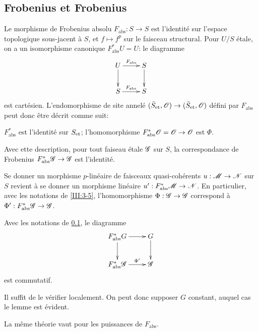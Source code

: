 \subsection{Frobenius et Frobenius}\label{III:3-4}

Le morphisme de Frobenius absolu $F_\text{abs}:S\to S$ est l'identité sur 
l'espace topologique sous-jacent à $S$, et $f\mapsto f^p$ sur le faisceau 
structural. Pour $U/S$ étale, on a un isomorphisme canonique 
$F_\text{abs}^* U=U$: le diagramme 
\[\xymatrix{
  U \ar[r]^-{F_\text{abs}} \ar[d] 
    & S \ar[d] \\
  S \ar[r]^-{F_\text{abs}} 
    & S
}\]
est cartésien. L'endomorphisme de site annelé 
$({\bar S}_{\textnormal{et}},\mathscr{O})\to({\bar S}_{\textnormal{et}},\mathscr{O})$ défini par $F_\text{abs}$ peut donc 
être décrit comme suit:
\begin{center}
  $F_\text{abs}^*$ est l'identité sur ${S}_{\textnormal{et}}$; l'homomorphisme 
  $F_\text{abs}^*\mathscr{O}=\mathscr{O}\to\mathscr{O}$ est $\Phi$.
\end{center}
Avec ette description, pour tout faiseau étale $\mathscr{G}$ sur $S$, la 
correspondance de Frobenius $F_\text{abs}^*\mathscr{G}\to\mathscr{G}$ est l'identité. 

Se donner un morphisme $p$-linéaire de faisceaux quasi-cohérents 
$u:\mathscr{M}\to\mathscr{N}$ sur $S$ revient à se donner un morphisme linéaire 
$u':F_\text{abs}^*\mathscr{M}\to\mathscr{N}$. En particulier, avec les notations de 
\ref{III:3-5}, l'homomorphisme $\Phi:\mathscr{G}\to\mathscr{G}$ correspond à 
$\Phi':F_\text{abs}^*\mathscr{G}\to\mathscr{G}$. 





\begin{lemma_}\label{III:3-5}
Avec les notations de \ref{III:3-4}, le diagramme 
\[\xymatrix{
  F_\textnormal{abs}^* G \ar[r] \ar[d] 
    & G \ar[d] \\
  F_\textnormal{abs}^*\cG \ar[r]^-{\Phi'} 
    & \cG 
}\]
est commutatif.
\end{lemma_}

Il suffit de le vérifier localement. On peut donc supposer $G$ constant, 
auquel cas le lemme est évident. 

La même théorie vaut pour les puissances de $F_\text{abs}$.





\subsection{}\label{III:3-6}

